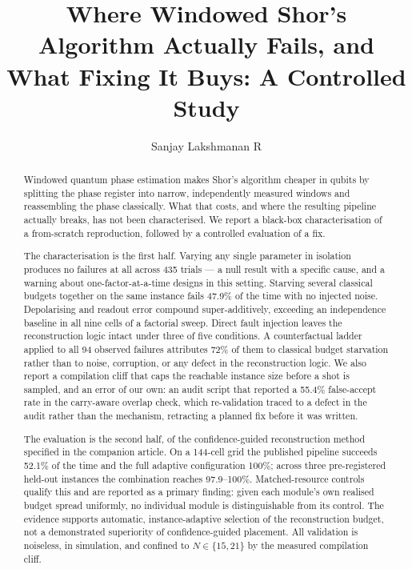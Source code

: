 \documentclass[preprint,11pt]{elsarticle}
\begin{document}
\begin{frontmatter}


\title{Where Windowed Shor's Algorithm Actually Fails, and What Fixing
It Buys: A Controlled Study}

\author[inst1]{Sanjay Lakshmanan R}

\address[inst1]{Department of Computer Science and Engineering,
Amrita Vishwa Vidyapeetham, Chennai, India}

\begin{abstract}
Windowed quantum phase estimation makes Shor's algorithm cheaper in qubits
by splitting the phase register into narrow, independently measured windows
and reassembling the phase classically. What that costs, and where the
resulting pipeline actually breaks, has not been characterised. We report a
black-box characterisation of a from-scratch reproduction, followed by a
controlled evaluation of a fix.

The characterisation is the first half. Varying any single parameter in
isolation produces no failures at all across 435 trials --- a null result
with a specific cause, and a warning about one-factor-at-a-time designs in
this setting. Starving several classical budgets together on the same
instance fails 47.9\% of the time with no injected noise. Depolarising and
readout error compound super-additively, exceeding an independence baseline
in all nine cells of a factorial sweep. Direct fault injection leaves the
reconstruction logic intact under three of five conditions. A counterfactual
ladder applied to all 94 observed failures attributes 72\% of them to
classical budget starvation rather than to noise, corruption, or any defect
in the reconstruction logic. We also report a compilation cliff that caps
the reachable instance size before a shot is sampled, and an error of our
own: an audit script that reported a 55.4\% false-accept rate in the
carry-aware overlap check, which re-validation traced to a defect in the
audit rather than the mechanism, retracting a planned fix before it was
written.

The evaluation is the second half, of the confidence-guided reconstruction
method specified in the companion article. On a 144-cell grid the published
pipeline succeeds 52.1\% of the time and the full adaptive configuration
100\%; across three pre-registered held-out instances the combination
reaches 97.9--100\%. Matched-resource controls qualify this and are reported
as a primary finding: given each module's own realised budget spread
uniformly, no individual module is distinguishable from its control. The
evidence supports automatic, instance-adaptive selection of the
reconstruction budget, not a demonstrated superiority of confidence-guided
placement. All validation is noiseless, in simulation, and confined to
$N\in\{15,21\}$ by the measured compilation cliff.
\end{abstract}


\end{frontmatter}
\end{document}
